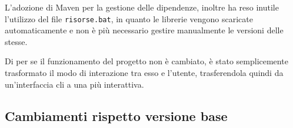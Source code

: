 L'adozione di Maven per la gestione delle dipendenze, inoltre ha reso inutile l'utilizzo del file \texttt{risorse.bat}, in quanto le librerie vengono scaricate automaticamente e non è più necessario gestire manualmente le versioni delle stesse.

Di per se il funzionamento del progetto non è cambiato, è stato semplicemente trasformato il modo di interazione tra esso e l'utente, trasferendola quindi da un'interfaccia cli a una più interattiva.  


\subsection{Cambiamenti rispetto versione base}


